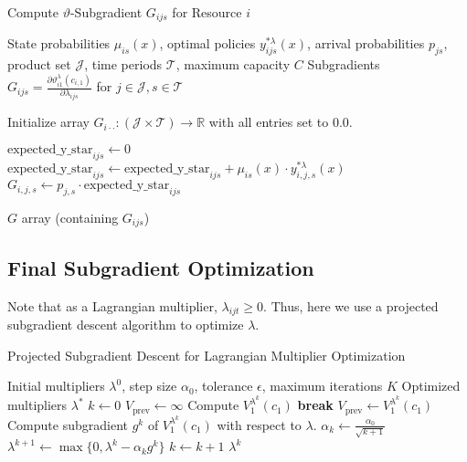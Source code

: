\documentclass[11pt]{article}
\newcommand{\R}{\mathbb{R}}
\begin{document}
\begin{algorithm}[H]
\caption{Compute $\vartheta$-Subgradient $G_{ijs}$ for Resource $i$}
\label{alg:compute_subgrad_vartheta}
\begin{algorithmic}[1]
\Require State probabilities $\mu_{is}(x)$, optimal policies $y^{*\lambda}_{ijs}(x)$, arrival probabilities $p_{js}$, product set $\mathcal{J}$, time periods $\mathcal{T}$, maximum capacity $C$
\Ensure Subgradients $G_{ijs} = \frac{\partial \vartheta^\lambda_{i1}(c_{i,1})}{\partial \lambda_{ijs}}$ for $j \in \mathcal{J}, s \in \mathcal{T}$

\State Initialize array $G_{i \cdot \cdot} : (\mathcal{J} \times \mathcal{T}) \to \R$ with all entries set to $0.0$.

 
     
        \State $\text{expected\_y\_star}_{ijs} \gets 0$
         
             
                \State $\text{expected\_y\_star}_{ijs} \gets \text{expected\_y\_star}_{ijs} + \mu_{is}(x) \cdot y^{*\lambda}_{i,j,s}(x)$
            \EndIf
        \EndFor
        \State $G_{i,j,s} \gets p_{j,s} \cdot \text{expected\_y\_star}_{ijs}$
    \EndFor
\EndFor

\State \Return $G$ array (containing $G_{ijs}$)
\end{algorithmic}
\end{algorithm}



\subsection{Final Subgradient Optimization}

\noindent
Note that as a Lagrangian multiplier, $\lambda_{ijt} \ge 0$. 
Thus, here we use a projected subgradient descent algorithm to optimize $\lambda$.
\begin{algorithm}[H]
\caption{Projected Subgradient Descent for Lagrangian Multiplier Optimization}
\begin{algorithmic}[1]
\Require Initial multipliers $\lambda^0$, step size $\alpha_0$, tolerance $\epsilon$, maximum iterations $K$
\Ensure Optimized multipliers $\lambda^*$
\State $k \gets 0$
\State $V_{\text{prev}} \gets \infty$
    \State Compute $V^{\lambda^k}_{1}(c_{1})$
        \State \textbf{break}
    \EndIf
    \State $V_{\text{prev}} \gets V^{\lambda^k}_{1}(c_{1})$
    \State Compute subgradient $g^k$ of $V^{\lambda^k}_{1}(c_{1})$ with respect to $\lambda$. 
    \State $\alpha_k \gets \frac{\alpha_0}{\sqrt{k+1}}$
    \State $\lambda^{k+1} \gets \max\{0, \lambda^k - \alpha_k g^k\}$ 
    \State $k \gets k + 1$
\EndWhile
\State \Return $\lambda^k$
\end{algorithmic}
\end{algorithm}
\end{document}
